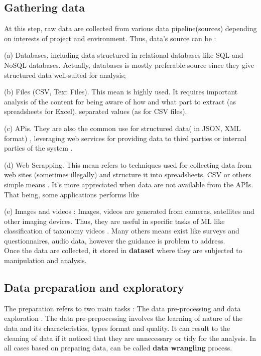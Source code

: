 \documentclass[12pt,a4paper, oneside]{book}
\begin{document}
\subsection{Gathering data}
At this step, raw data are collected from various data pipeline(sources) depending on interests of project and environment. Thus, data's source can be :  

(a) Databases, including data structured in relational databases like SQL and NoSQL databases. Actually, databases is mostly preferable source since they give structured data well-suited for analysis;

(b)  Files (CSV, Text Files). This mean is highly used. It requires important analysis of the content for being aware of how and what part to extract (as spreadsheets for Excel), separated values (as for CSV files).

(c) APis. They are also the common use for structured data( in JSON, XML format) , leveraging web services for providing data to third parties or internal parties of the system \cite{dataScienceMLeric}.

(d) Web Scrapping. This mean refers to techniques used for collecting data from web sites (sometimes illegally) and structure it into spreadsheets, CSV or others simple means \cite{sirisuriya2015comparative}. It's more appreciated when data are not available from the APIs. That being, some applications performs like 

(e) Images and videos : Images, videos are generated from cameras, satellites and other imaging devices. Thus, they are useful in specific tasks of ML like classification of taxonomy videos \cite{reviewVideo2020}. 
Many others means exist like surveys and questionnaires, audio data, however the guidance is problem to address. 
\\
Once the data are collected, it stored in \textbf{dataset} where they are subjected to manipulation and analysis.
\subsection{Data preparation and exploratory}
The preparation refers to two main tasks : The data pre-processing and data exploration . The data pre-prepocessing involves the learning of nature of the data and its characteristics, types format and quality. It can result to the cleaning of data if it noticed that they are unnecessary or tidy for the analysis. In all cases based on preparing data, can be called \textbf{data wrangling} \cite{furche2016data} process.
\end{document}
